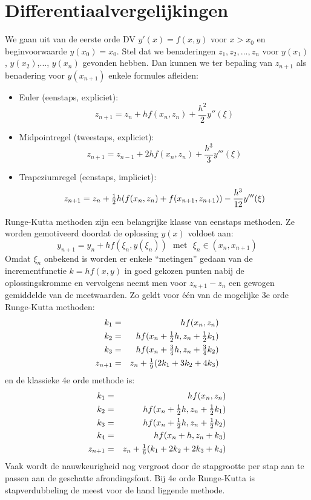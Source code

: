 \section{Differentiaalvergelijkingen}
We gaan uit van de eerste orde DV $y'(x)=f(x,y)$ voor $x>x_0$ en beginvoorwaarde
$y(x_0)=x_0$. Stel dat we benaderingen $z_1,z_2,...,z_n$ voor $y(x_1)$,
$y(x_2)$,..., $y(x_n)$ gevonden hebben. Dan kunnen we ter bepaling van
$z_{n+1}$ als benadering voor $y(x_{n+1})$ enkele formules afleiden:
\begin{itemize}
\item Euler (eenstaps, expliciet):
\[
z_{n+1}=z_n+hf(x_n,z_n)+\frac{h^2}{2}y''(\xi)
\]
\item Midpointregel (tweestaps, expliciet):
\[
z_{n+1}=z_{n-1}+2hf(x_n,z_n)+\frac{h^3}{3}y'''(\xi)
\]
\item Trapeziumregel (eenstaps, impliciet):
\[
z_{n+1}=z_n+\mbox{$\frac{1}{2}$} h(f(x_n,z_n)+f(x_{n+1},z_{n+1}))-\frac{h^3}{12}y'''(\xi)
\]
\end{itemize}
Runge-Kutta methoden zijn een belangrijke klasse van eenstaps methoden. Ze
worden gemotiveerd doordat de oplossing $y(x)$ voldoet aan:
\[
y_{n+1}=y_n+hf(\xi_n,y(\xi_n))~~~\mbox{met}~~~\xi_n\in(x_n,x_{n+1})
\]
Omdat $\xi_n$ onbekend is worden er enkele ``metingen'' gedaan van de
incrementfunctie $k=hf(x,y)$ in goed gekozen punten nabij de oplossingskromme
en vervolgens neemt men voor $z_{n+1}-z_n$ een gewogen gemiddelde van de
meetwaarden. Zo geldt voor \'e\'en van de mogelijke 3e orde Runge-Kutta methoden:
\begin{eqnarray*}
k_1&=&hf(x_n,z_n)\\
k_2&=&hf(x_n+\mbox{$\frac{1}{2}$} h,z_n+\mbox{$\frac{1}{2}$} k_1)\\
k_3&=&hf(x_n+\mbox{$\frac{3}{4}$}h,z_n+\mbox{$\frac{3}{4}$}k_2)\\
z_{n+1}&=&z_n+\mbox{$\frac{1}{9}$}(2k_1+3k_2+4k_3)
\end{eqnarray*}
en de klassieke 4e orde methode is:
\begin{eqnarray*}
k_1&=&hf(x_n,z_n)\\
k_2&=&hf(x_n+\mbox{$\frac{1}{2}$} h,z_n+\mbox{$\frac{1}{2}$} k_1)\\
k_3&=&hf(x_n+\mbox{$\frac{1}{2}$} h,z_n+\mbox{$\frac{1}{2}$} k_2)\\
k_4&=&hf(x_n+h,z_n+k_3)\\
z_{n+1}&=&z_n+\mbox{$\frac{1}{6}$}(k_1+2k_2+2k_3+k_4)
\end{eqnarray*}
Vaak wordt de nauwkeurigheid nog vergroot door de stapgrootte per stap aan
te passen aan de geschatte afrondingsfout. Bij 4e orde Runge-Kutta is
stapverdubbeling de meest voor de hand liggende methode.

